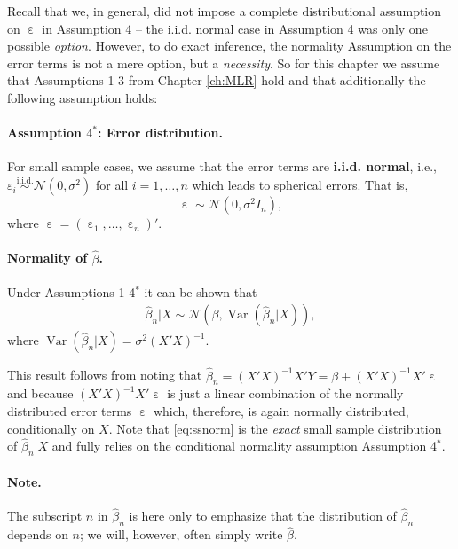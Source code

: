 \documentclass[
  14pt,
]{memoir}
\DeclareMathOperator{\eps}{\varepsilon}
\DeclareMathOperator{\V}{\operatorname{Var}}
\begin{document}
Recall that we, in general, did not impose a complete distributional assumption on \(\eps\) in Assumption 4 -- the i.i.d. normal case in Assumption 4 was only one possible \emph{option}. However, to do exact inference, the normality Assumption on the error terms is not a mere option, but a \emph{necessity}. So for this chapter we assume that Assumptions 1-3 from Chapter \ref{ch:MLR} hold and that additionally the following assumption holds:

\paragraph*{Assumption $4^\ast$: Error distribution.}

For small sample cases, we assume that the error terms are
\textbf{i.i.d. normal}, i.e., \(\varepsilon_i\overset{\operatorname{i.i.d.}}{\sim}\mathcal{N}(0,\sigma^2)\) for all \(i=1,\dots,n\) which leads to spherical errors. That is,
\[
\eps\sim\mathcal{N}\left(0,\sigma^2I_n\right),
\]
where \(\eps=(\eps_1,\dots,\eps_n)'\).

\bigskip

\paragraph*{Normality of $\hat\beta$.}

Under Assumptions 1-4\(^\ast\) it can be shown that
\begin{align}
\hat\beta_n|X \sim \mathcal{N}\left(\beta,\V(\hat\beta_n|X)\right),\label{eq:ssnorm}
\end{align}
where \(\V(\hat\beta_n|X)=\sigma^2(X'X)^{-1}\).

This result follows from noting that \(\hat\beta_n=(X'X)^{-1}X'Y=\beta+(X'X)^{-1}X'\eps\) and because \((X'X)^{-1}X'\eps\) is just a linear combination of the normally distributed error terms \(\eps\) which, therefore, is again normally distributed, conditionally on \(X\). Note that \eqref{eq:ssnorm} is the \textit{exact} small sample distribution of \(\hat\beta_n|X\) and fully relies on the conditional normality assumption Assumption 4\(^*\).

\paragraph*{Note.}

The subscript \(n\) in \(\hat\beta_n\) is here only to emphasize that the distribution of \(\hat\beta_n\) depends on \(n\); we will, however, often simply write \(\hat\beta\).
\end{document}
